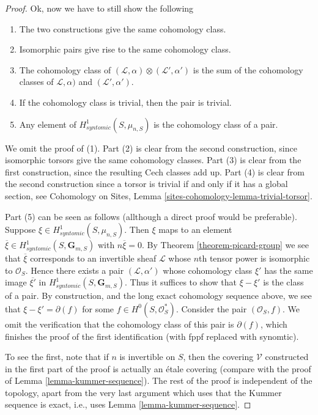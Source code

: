 \begin{proof}
\medskip\noindent
Ok, now we have to still show the following
\begin{enumerate}
\item The two constructions give the same cohomology class.
\item Isomorphic pairs give rise to the same cohomology class.
\item The cohomology class of
$(\mathcal{L}, \alpha) \otimes (\mathcal{L}', \alpha')$
is the sum of the cohomology classes of
$\mathcal{L}, \alpha)$ and $(\mathcal{L}', \alpha')$.
\item If the cohomology class is trivial, then the pair is trivial.
\item Any element of $H^1_{syntomic}(S, \mu_{n, S})$ is the
cohomology class of a pair.
\end{enumerate}
We omit the proof of (1). Part (2) is clear from the second construction,
since isomorphic torsors give the same cohomology classes.
Part (3) is clear from the first construction, since the resulting
Cech classes add up. Part (4) is clear from the second construction
since a torsor is trivial if and only if it has a global section, see
Cohomology on Sites, Lemma \ref{sites-cohomology-lemma-trivial-torsor}.

\medskip\noindent
Part (5) can be seen as follows (allthough a direct proof would be
preferable). Suppose $\xi \in H^1_{syntomic}(S, \mu_{n, S})$.
Then $\xi$ maps to an element
$\overline{\xi} \in H^1_{syntomic}(S, \mathbf{G}_{m, S})$
with $n \overline{\xi} = 0$. By
Theorem \ref{theorem-picard-group}
we see that $\overline{\xi}$ corresponds to an invertible sheaf $\mathcal{L}$
whose $n$th tensor power is isomorphic to $\mathcal{O}_S$.
Hence there exists a pair $(\mathcal{L}, \alpha')$ whose cohomology
class $\xi'$ has the same image $\overline{\xi'}$ in
$H^1_{syntomic}(S, \mathbf{G}_{m, S})$. Thus it suffices to show
that $\xi - \xi'$ is the class of a pair. By construction, and the
long exact cohomology sequence above, we see that
$\xi - \xi' = \partial(f)$ for some $f \in H^0(S, \mathcal{O}_S^*)$.
Consider the pair $(\mathcal{O}_S, f)$. We omit the verification
that the cohomology class of this pair is $\partial(f)$, which
finishes the proof of the first identification (with fppf replaced
with synomtic).

\medskip\noindent
To see the first, note that if $n$ is invertible on $S$, then the
covering $\mathcal{V}$ constructed in the first part of the proof
is actually an \'etale covering (compare with the proof of
Lemma \ref{lemma-kummer-sequence}). The rest of the proof is independent
of the topology, apart from the very last argument which uses that
the Kummer sequence is exact, i.e., uses Lemma \ref{lemma-kummer-sequence}.
\end{proof}






